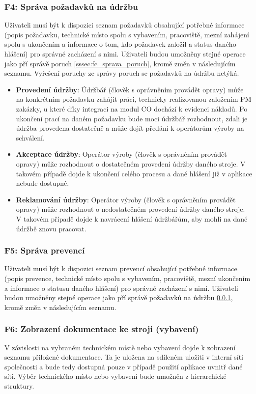 \documentclass[thesis=M,czech]{FITthesis}[2012/06/26]
\begin{document}
\subsubsection{F4: Správa požadavků na údržbu}
\label{sssec:fc_sprava_poz_udr}
Uživateli musí být k dispozici seznam požadavků obsahující potřebné informace (popis požadavku, technické místo spolu s vybavením, pracoviště, mezní zahájení spolu s ukončením a informace o tom, kdo požadavek založil a status daného hlášení) pro správné zacházení s nimi. Uživateli budou umožněny stejné operace jako pří správě poruch \ref{sssec:fc_sprava_poruch}, kromě změn v následujícím seznamu. Vyřešení poruchy ze správy poruch se požadavků na údržbu netýká.
\begin{itemize}
	\item
	\textbf{Provedení údržby}: Údržbář (člověk s oprávněním provádět opravy) může na konkrétním požadavku zahájit práci, technicky realizovanou založením PM zakázky, u které díky integraci na modul CO dochází k evidenci nákladů. Po ukončení prací na daném požadavku bude moci údržbář rozhodnout, zdali je údržba provedena dostatečně a může dojít předání k operátorům výroby na schválení. 
	\item
	\textbf{Akceptace údržby}: Operátor výroby (člověk s oprávněním provádět opravy) může rozhodnout o dostatečném provedení údržby daného stroje. V takovém případě dojde k ukončení celého procesu a dané hlášení již v aplikace nebude dostupné.
	\item
	\textbf{Reklamování údržby}: Operátor výroby (člověk s oprávněním provádět opravy) může rozhodnout o nedostatečném provedení údržby daného stroje. V takovém případě dojde k navrácení hlášení údržbářům, aby mohli na dané údržbě znovu pracovat.
\end{itemize} 
\subsubsection{F5: Správa prevencí}
\label{sssec:fc_sprava_prev}
Uživateli musí být k dispozici seznam prevencí obsahující potřebné informace (popis prevence, technické místo spolu s vybavením, pracoviště, mezní ukončením a informace o statusu daného hlášení) pro správné zacházení s nimi. Uživateli budou umožněny stejné operace jako pří správě požadavků na údržbu \ref{sssec:fc_sprava_poz_udr}, kromě změn v následujícím seznamu. 
\subsubsection{F6: Zobrazení dokumentace ke stroji (vybavení)}
\label{sssec:fc_zobrazeni_dokumentace}
V závislosti na vybraném technickém místě nebo vybavení dojde k zobrazení seznamu přiložené dokumentace. Ta je uložena na sdíleném uložiti v interní síti společnosti a bude tedy dostupná pouze v případě použití aplikace uvnitř dané síti. Výběr technického místo nebo vybavení bude umožněn z hierarchické struktury.
\end{document}
